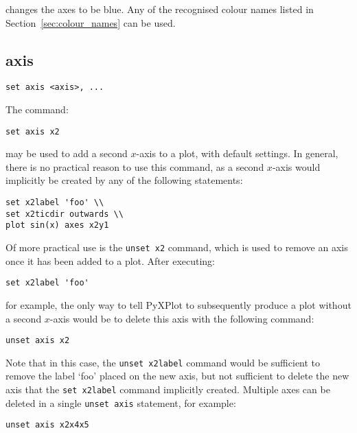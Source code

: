 \noindent changes the axes to be blue. Any of the recognised colour names listed in
Section~\ref{sec:colour_names} can be used.
 

\subsection{axis}

\begin{verbatim}
set axis <axis>, ...
\end{verbatim}

The command:

\begin{verbatim}
set axis x2
\end{verbatim}

\noindent may be used to add a second $x$-axis to a plot, with default settings. In
general, there is no practical reason to use this command, as a second $x$-axis
would implicitly be created by any of the following statements:

\begin{verbatim}
set x2label 'foo' \\
set x2ticdir outwards \\
plot sin(x) axes x2y1
\end{verbatim}

Of more practical use is the {\tt unset x2} command, which is used to remove an
axis once it has been added to a plot. After executing:

\begin{verbatim}
set x2label 'foo'
\end{verbatim}

\noindent for example, the only way to tell PyXPlot to subsequently produce a plot
without a second $x$-axis would be to delete this axis with the following
command:

\begin{verbatim}
unset axis x2
\end{verbatim}

Note that in this case, the {\tt unset x2label} command would be sufficient to
remove the label `foo' placed on the new axis, but not sufficient to delete the
new axis that the {\tt set x2label} command implicitly created. Multiple axes
can be deleted in a single {\tt unset axis} statement, for example:

\begin{verbatim}
unset axis x2x4x5
\end{verbatim}

